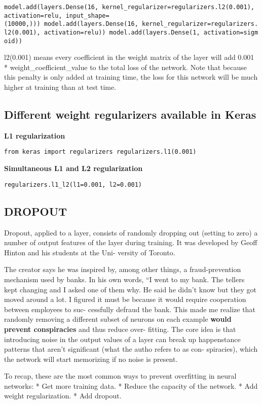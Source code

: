 \documentclass[11pt]{article}
\begin{document}
\texttt{model.add(layers.Dense(16,\ kernel\_regularizer=regularizers.l2(0.001),\ activation=\textquotesingle{}relu\textquotesingle{},\ input\_shape=(10000,)))\ model.add(layers.Dense(16,\ kernel\_regularizer=regularizers.l2(0.001),\ activation=\textquotesingle{}relu\textquotesingle{}))\ model.add(layers.Dense(1,\ activation=\textquotesingle{}sigmoid\textquotesingle{}))}

    l2(0.001) means every coefficient in the weight matrix of the layer will
add 0.001 * weight\_coefficient\_value to the total loss of the network.
Note that because this penalty is only added at training time, the loss
for this network will be much higher at training than at test time.

    \hypertarget{different-weight-regularizers-available-in-keras}{%
\subsection{Different weight regularizers available in
Keras}\label{different-weight-regularizers-available-in-keras}}

\textbf{L1 regularization}

\texttt{from\ keras\ import\ regularizers\ regularizers.l1(0.001)}

\textbf{Simultaneous L1 and L2 regularization}

\texttt{regularizers.l1\_l2(l1=0.001,\ l2=0.001)}

    \hypertarget{dropout}{%
\subsection{DROPOUT}\label{dropout}}

Dropout, applied to a layer, consists of randomly dropping out (setting
to zero) a number of output features of the layer during training. It
was developed by Geoff Hinton and his students at the Uni- versity of
Toronto.

The creator says he was inspired by, among other things, a
fraud-prevention mechanism used by banks. In his own words, ``I went to
my bank. The tellers kept changing and I asked one of them why. He said
he didn't know but they got moved around a lot. I figured it must be
because it would require cooperation between employees to suc- cessfully
defraud the bank. This made me realize that randomly removing a
different subset of neurons on each example \textbf{would prevent
conspiracies} and thus reduce over- fitting. The core idea is that
introducing noise in the output values of a layer can break up
happenstance patterns that aren't significant (what the autho refers to
as con- spiracies), which the network will start memorizing if no noise
is present.

    To recap, these are the most common ways to prevent overfitting in
neural networks: * Get more training data. * Reduce the capacity of the
network. * Add weight regularization. * Add dropout.


    
    
    
    
\end{document}
